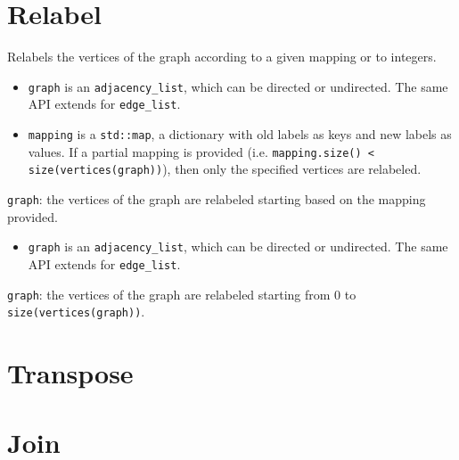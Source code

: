 \section{Relabel}
Relabels the vertices of the graph according to a given mapping or to integers.

{\small
      
}
\begin{itemdescr}
    \pnum\preconditions
    \begin{itemize}
          \item
                \lstinline{graph} is an \lstinline{adjacency_list}, which can be directed or undirected. The same API extends for \lstinline{edge_list}.
            \item
                \lstinline{mapping} is a \lstinline{std::map}, a dictionary with old labels as keys and new labels as values. If a partial mapping is provided (i.e. \lstinline{mapping.size() < size(vertices(graph))}), then only the specified vertices are relabeled.
    \end{itemize}
    \pnum\effects \lstinline{graph}: the vertices of the graph are relabeled starting based on the mapping provided.
\end{itemdescr}

{\small
      
}
\begin{itemdescr}
    \pnum\preconditions
    \begin{itemize}
          \item
                \lstinline{graph} is an \lstinline{adjacency_list}, which can be directed or undirected. The same API extends for \lstinline{edge_list}.
    \end{itemize}
    \pnum\effects \lstinline{graph}: the vertices of the graph are relabeled starting from 0 to \lstinline{size(vertices(graph))}.
\end{itemdescr}

\section{Transpose}
\section{Join}